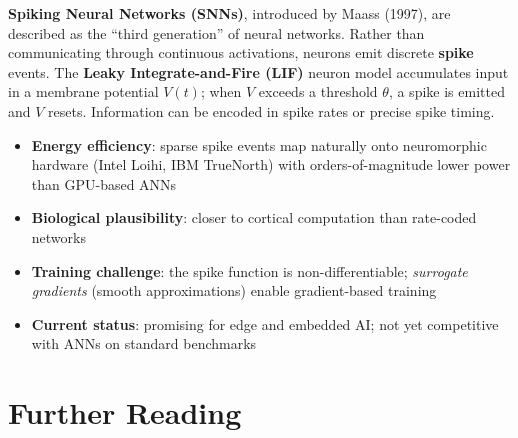 \begin{tcbitemize}[ skin=sectionraster ]
    \tcbitem[title={Third-Generation Neural Networks}, raster multicolumn=6]
    \textbf{Spiking Neural Networks (SNNs)}, introduced by Maass (1997), are described as the ``third generation'' of neural networks.
    Rather than communicating through continuous activations, neurons emit discrete \textbf{spike} events.
    The \textbf{Leaky Integrate-and-Fire (LIF)} neuron model accumulates input in a membrane potential $V(t)$; when $V$ exceeds a threshold $\theta$, a spike is emitted and $V$ resets.
    Information can be encoded in spike rates or precise spike timing.
    \tcblower
    \begin{itemize}
        \item \textbf{Energy efficiency}: sparse spike events map naturally onto neuromorphic hardware (Intel Loihi, IBM TrueNorth) with orders-of-magnitude lower power than GPU-based ANNs
        \item \textbf{Biological plausibility}: closer to cortical computation than rate-coded networks
        \item \textbf{Training challenge}: the spike function is non-differentiable; \emph{surrogate gradients} (smooth approximations) enable gradient-based training
        \item \textbf{Current status}: promising for edge and embedded AI; not yet competitive with ANNs on standard benchmarks
    \end{itemize}
\end{tcbitemize}


\section{Further Reading}

